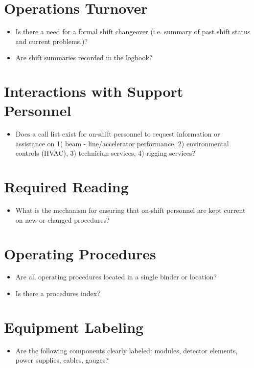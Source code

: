\section{Operations Turnover}


\begin{itemize}
\item   Is there a need for a formal shift changeover (i.e. summary of past shift status and 
current problems.)?

\item   Are shift summaries recorded in the logbook?

\end{itemize}

\section{Interactions with Support Personnel}


\begin{itemize}
\item   Does a call list exist for on-shift personnel to request information or assistance on 
1) beam - line/accelerator performance, 2) environmental controls (HVAC), 3) technician 
services, 4) rigging services?

\end{itemize}

\section{Required Reading}


\begin{itemize}
\item   What is the mechanism for ensuring that on-shift personnel are kept current on 
new or changed procedures?

\end{itemize}

\section{Operating Procedures}


\begin{itemize}
\item   Are all operating procedures located in a single binder or location?

\item   Is there a procedures index?

\end{itemize}

\section{Equipment Labeling}

\begin{itemize}
\item   Are the following components clearly labeled: modules, detector elements, power 
supplies, cables, gauges?

\end{itemize}




